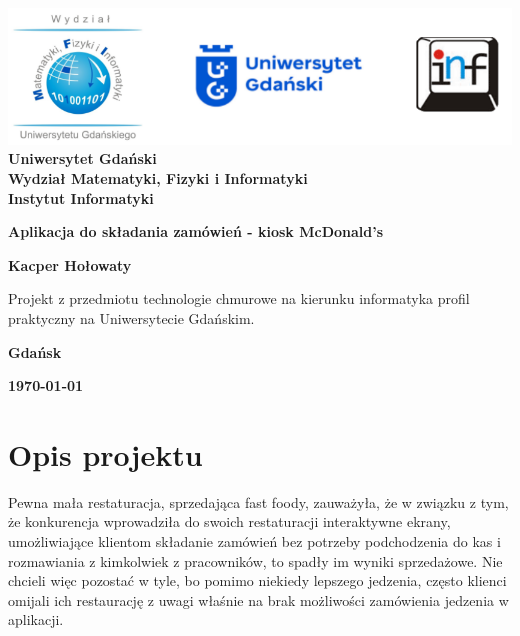 \documentclass[12pt,a4paper]{article}
\newcommand{\hmwkTitle}{Aplikacja do składania zamówień - kiosk McDonald's}
\newcommand{\hmwkDueDate}{\today}
\newcommand{\hmwkAuthorName}{Kacper Hołowaty}
\begin{document}
\begin{titlepage}
    \vfill
	\begin{center}
	\hspace*{-1cm}
	\vspace*{0.5cm}
    \includegraphics[scale=0.55]{imagens/loga.png}\\
	\textbf{Uniwersytet Gdański \\ [0.05cm]Wydział Matematyki, Fizyki i Informatyki \\ [0.05cm] Instytut Informatyki}

	\vspace{0.6cm}
	\vspace{4cm}
	{\huge \textbf{\hmwkTitle}}\vspace{8mm}
	
	{\large \textbf{\hmwkAuthorName}}\\[3cm]
	
		\hspace{.45\textwidth} %
	   \begin{minipage}{.5\textwidth}
	   Projekt z przedmiotu technologie chmurowe na kierunku informatyka profil praktyczny na Uniwersytecie Gdańskim.\\[0.1cm]
	  \end{minipage}
	  \vfill
	
	\textbf{Gdańsk}
	
	\textbf{\hmwkDueDate}
	\end{center}
	
\end{titlepage}

\newpage
\setcounter{secnumdepth}{5}
\tableofcontents
\newpage

\section{Opis projektu}
\label{sec:Project}

Pewna mała restaturacja, sprzedająca fast foody, zauważyła, że w związku z tym, że konkurencja wprowadziła do swoich restaturacji interaktywne ekrany, umożliwiające klientom składanie zamówień bez potrzeby podchodzenia do kas i rozmawiania z kimkolwiek z pracowników, to spadły im wyniki sprzedażowe. Nie chcieli więc pozostać w tyle, bo pomimo niekiedy lepszego jedzenia, często klienci omijali ich restaurację z uwagi właśnie na brak możliwości zamówienia jedzenia w aplikacji. 
\end{document}
